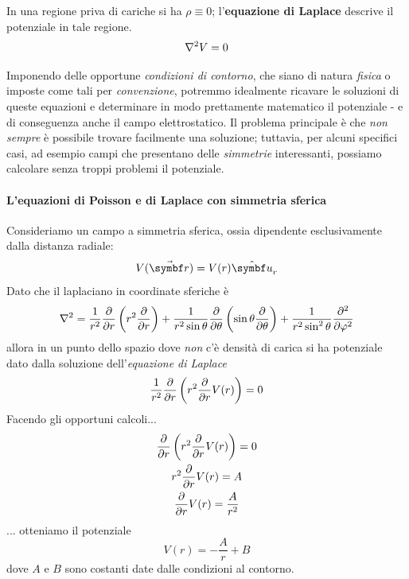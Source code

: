 In una regione priva di cariche si ha $\rho\equiv0$; l'\textbf{equazione di Laplace} descrive il potenziale in tale regione.
\begin{equation}
	\laplacian{V}=0
\end{equation}

Imponendo delle opportune \textit{condizioni di contorno}, che siano di natura \textit{fisica} o imposte come tali per \textit{convenzione}, potremmo idealmente ricavare le soluzioni di queste equazioni e determinare in modo prettamente matematico il potenziale - e di conseguenza anche il campo elettrostatico. Il problema principale è che \textit{non sempre} è possibile trovare facilmente una soluzione; tuttavia, per alcuni specifici casi, ad esempio campi che presentano delle \textit{simmetrie} interessanti, possiamo calcolare senza troppi problemi il potenziale.
\paragraph{L'equazioni di Poisson e di Laplace con simmetria sferica}\label{EquazioniPoissonSimmetriaSferica}
Consideriamo un campo a simmetria sferica, ossia dipendente esclusivamente dalla distanza radiale:
\begin{equation*}
	V(\vba{r})=V(r)\vbh{u}_r
\end{equation*}
Dato che il laplaciano in coordinate sferiche è
	\begin{equation*}
		\laplacian=\frac{1}{r^2}\pdv{r}\left(r^2\pdv{r}\right)+\frac{1}{r^2\sin\theta}\pdv{\theta}\left(\sin\theta\pdv{\theta}\right)+\frac{1}{r^2\sin^2\theta}\pdv[2]{\phi}
	\end{equation*}
allora in un punto dello spazio dove \textit{non} c'è densità di carica si ha potenziale dato dalla soluzione dell'\textit{equazione di Laplace}
\begin{equation*}
	\frac{1}{r^2}\pdv{r}\left(r^2\pdv{r}V(r)\right)=0
\end{equation*}
Facendo gli opportuni calcoli...
\begin{gather*}
	\pdv{r}\left(r^2\pdv{r}V(r)\right)=0\\
	r^2\pdv{r}V(r)=A\\
	\pdv{r}V(r)=\frac{A}{r^2}\\
\end{gather*}
... otteniamo il potenziale
\begin{equation}
	V(r)=-\frac{A}{r}+B
\end{equation}
dove $A$ e $B$ sono costanti date dalle condizioni al contorno.

